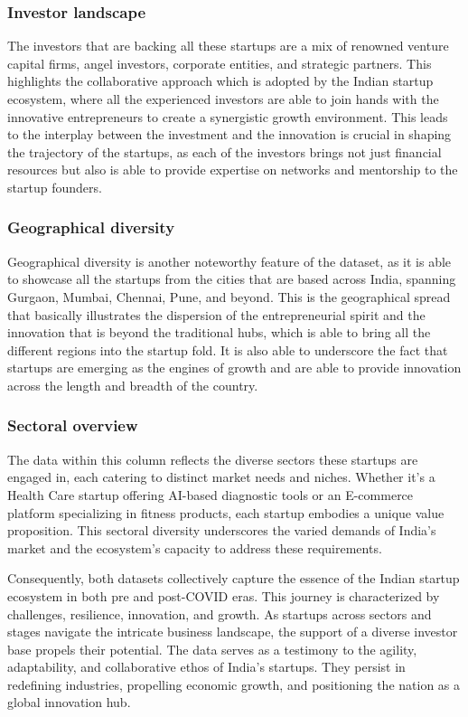 \documentclass[12pt]{article}
\begin{document}
\subsubsection{Investor landscape}

The investors that are backing all these startups are a mix of renowned venture capital firms, angel investors, corporate entities, and strategic partners. This highlights the collaborative approach which is adopted by the Indian startup ecosystem, where all the experienced investors are able to join hands with the innovative entrepreneurs to create a synergistic growth environment. This leads to the interplay between the investment and the innovation is crucial in shaping the trajectory of the startups, as each of the investors brings not just financial resources but also is able to provide expertise on networks and mentorship to the startup founders.

\subsubsection{Geographical diversity}

Geographical diversity is another noteworthy feature of the dataset, as it is able to showcase all the startups from the cities that are based across India, spanning Gurgaon, Mumbai, Chennai, Pune, and beyond. This is the geographical spread that basically illustrates the dispersion of the entrepreneurial spirit and the innovation that is beyond the traditional hubs, which is able to bring all the different regions into the startup fold. It is also able to underscore the fact that startups are emerging as the engines of growth and are able to provide innovation across the length and breadth of the country.

\subsubsection{Sectoral overview}

The data within this column reflects the diverse sectors these startups are engaged in, each catering to distinct market needs and niches. Whether it's a Health Care startup offering AI-based diagnostic tools or an E-commerce platform specializing in fitness products, each startup embodies a unique value proposition. This sectoral diversity underscores the varied demands of India's market and the ecosystem's capacity to address these requirements.

Consequently, both datasets collectively capture the essence of the Indian startup ecosystem in both pre and post-COVID eras. This journey is characterized by challenges, resilience, innovation, and growth. As startups across sectors and stages navigate the intricate business landscape, the support of a diverse investor base propels their potential. The data serves as a testimony to the agility, adaptability, and collaborative ethos of India's startups. They persist in redefining industries, propelling economic growth, and positioning the nation as a global innovation hub.
\end{document}
